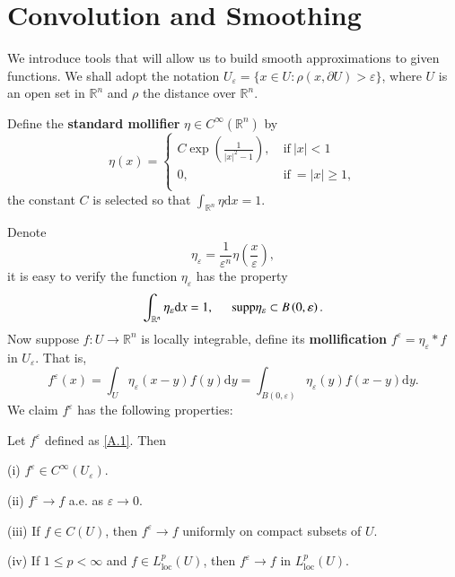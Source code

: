 \section{Convolution and Smoothing}\label{Appen.A}
We introduce tools that will allow us to build smooth approximations to given functions. We shall adopt the notation $U_\varepsilon=\{x\in U:\rho(x,\partial U)>\varepsilon\}$, where $U$ is an open set in $\mathbb{R}^n$ and $\rho$ the distance over $\mathbb{R}^n$.
\begin{definition}
Define the \textbf{standard mollifier} $\eta\in C^\infty(\mathbb{R}^n)$ by 
$$
\eta \left( x \right) =\left\{ \begin{aligned}
	C\exp \left( \frac{1}{\left| x \right|^2-1} \right),\ &\text{if}\ \left| x \right|<1\\
	0,\ &\text{if}\ =\left| x \right|\ge 1,\\
\end{aligned} \right. 
$$
the constant $C$ is selected so that $\int_{\mathbb{R}^n}\eta\mathrm{d}x=1$.
\end{definition}
Denote 
$$
\eta _{\varepsilon}=\frac{1}{\varepsilon ^n}\eta \left( \frac{x}{\varepsilon} \right) ,
$$
it is easy to verify the function $\eta_\varepsilon$ has the property 
$$
\int_{\mathbb{R} ^n}{\eta _{\varepsilon}\mathrm{d}x}=1,\hspace{0.5cm}\mathrm{supp}\eta _{\varepsilon}\subset B\left( 0,\varepsilon \right) .
$$
Now suppose $f:U\to\mathbb{R}^n$ is locally integrable, define its \textbf{mollification} $f^\varepsilon=\eta_\varepsilon*f$ in $U_\varepsilon$. That is, 
\begin{equation}\label{A.1}
f^{\varepsilon}\left( x \right) =\int_U{\eta _{\varepsilon}\left( x-y \right) f\left( y \right) \mathrm{d}y}=\int_{B\left( 0,\varepsilon \right)}{\eta _{\varepsilon}\left( y \right) f\left( x-y \right) \mathrm{d}y}.
\end{equation}
We claim $f^\varepsilon$ has the following properties: 
\begin{theorem}
Let $f^\varepsilon$ defined as \eqref{A.1}. Then \par
(i) $f^\varepsilon\in C^\infty(U_\varepsilon)$.\par
(ii) $f^\varepsilon\to f$ a.e. as $\varepsilon\to 0$.\par
(iii) If $f\in C(U)$, then $f^\varepsilon\to f$ uniformly on compact subsets of $U$.\par
(iv) If $1\le p<\infty$ and $f\in L_{\mathrm{loc}}^p(U)$, then $f^\varepsilon\to f$ in $L_{\mathrm{loc}}^p(U)$.
\end{theorem}

